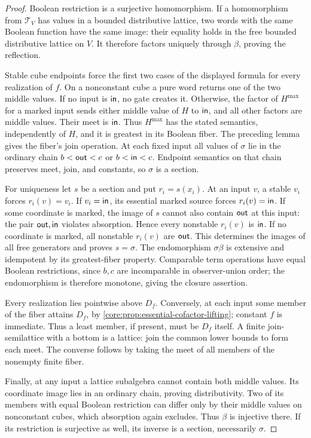 \begin{proof}
Boolean restriction is a surjective homomorphism. If a homomorphism
from $\mathcal T_V$ has values in a bounded distributive lattice,
two words with the same Boolean function have the same image: their
equality holds in the free bounded distributive lattice on $V$.
It therefore factors uniquely through $\beta$, proving the reflection.

Stable cube endpoints force the first two cases of the displayed formula
for every realization of $f$. On a nonconstant cube a pure word returns
one of the two middle values. If no input is $\mathsf{in}$, no gate creates it.
Otherwise, the factor of $H^{\max}$ for a marked input sends either
middle value of $H$ to $\mathsf{in}$, and all other factors are middle values.
Their meet is $\mathsf{in}$. Thus $H^{\max}$ has the stated semantics,
independently of $H$, and it is greatest in its Boolean fiber.
The preceding lemma gives the fiber's join operation.
At each fixed input all values of $\sigma$ lie in the ordinary chain
$b<\mathsf{out}<c$ or $b<\mathsf{in}<c$. Endpoint semantics on that chain preserves
meet, join, and constants, so $\sigma$ is a section.

For uniqueness let $s$ be a section and put $r_i=s(x_i)$.
At an input $v$, a stable $v_i$ forces $r_i(v)=v_i$.
If $v_i=\mathsf{in}$, its essential marked source forces $r_i(v)=\mathsf{in}$.
If some coordinate is marked, the image of $s$ cannot also contain
$\mathsf{out}$ at this input: the pair $\mathsf{out},\mathsf{in}$ violates absorption.
Hence every nonstable $r_i(v)$ is $\mathsf{in}$.
If no coordinate is marked, all nonstable $r_i(v)$ are $\mathsf{out}$.
This determines the images of all free generators and proves $s=\sigma$.
The endomorphism $\sigma\beta$ is extensive and idempotent by its
greatest-fiber property. Comparable term operations have equal Boolean
restrictions, since $b,c$ are incomparable in observer-union order;
the endomorphism is therefore monotone, giving the closure assertion.

Every realization lies pointwise above $D_f$. Conversely, at each input
some member of the fiber attains $D_f$, by
\cref{core:prop:essential-cofactor-lifting}; constant $f$ is immediate.
Thus a least member, if present, must be $D_f$ itself.
A finite join-semilattice with a bottom is a lattice: join the common
lower bounds to form each meet. The converse follows by taking the
meet of all members of the nonempty finite fiber.

Finally, at any input a lattice subalgebra cannot contain both middle
values. Its coordinate image lies in an ordinary chain, proving
distributivity. Two of its members with equal Boolean restriction can
differ only by their middle values on nonconstant cubes, which absorption
again excludes. Thus $\beta$ is injective there. If its restriction is
surjective as well, its inverse is a section, necessarily $\sigma$.
\end{proof}

